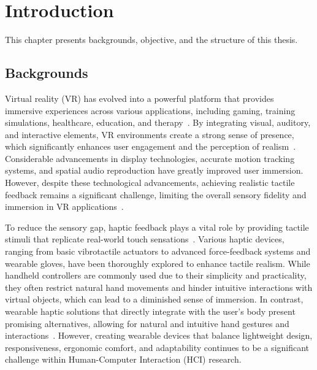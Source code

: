 
\chapter{Introduction} %

\label{Chapter1} %


\newcommand{\keyword}[1]{\textbf{#1}}
\newcommand{\tabhead}[1]{\textbf{#1}}
\newcommand{\code}[1]{\texttt{#1}}
\newcommand{\file}[1]{\texttt{\bfseries#1}}
\newcommand{\option}[1]{\texttt{\itshape#1}}

This chapter presents backgrounds, objective, and the structure of this thesis.

\section{Backgrounds}
Virtual reality (VR) has evolved into a powerful platform that provides immersive experiences across various applications, including gaming, training simulations, healthcare, education, and therapy~\cite{10.3389/frobt.2016.00074}. By integrating visual, auditory, and interactive elements, VR environments create a strong sense of presence, which significantly enhances user engagement and the perception of realism~\cite{10.5555/207922}. Considerable advancements in display technologies, accurate motion tracking systems, and spatial audio reproduction have greatly improved user immersion. However, despite these technological advancements, achieving realistic tactile feedback remains a significant challenge, limiting the overall sensory fidelity and immersion in VR applications~\cite{10.1146/annurev-control-060117-105043}.

To reduce the sensory gap, haptic feedback plays a vital role by providing tactile stimuli that replicate real-world touch sensations~\cite{10.1146/annurev-control-060117-105043}. Various haptic devices, ranging from basic vibrotactile actuators to advanced force-feedback systems and wearable gloves, have been thoroughly explored to enhance tactile realism. While handheld controllers are commonly used due to their simplicity and practicality, they often restrict natural hand movements and hinder intuitive interactions with virtual objects, which can lead to a diminished sense of immersion. In contrast, wearable haptic solutions that directly integrate with the user's body present promising alternatives, allowing for natural and intuitive hand gestures and interactions~\cite{7922602}. However, creating wearable devices that balance lightweight design, responsiveness, ergonomic comfort, and adaptability continues to be a significant challenge within Human-Computer Interaction (HCI) research.


